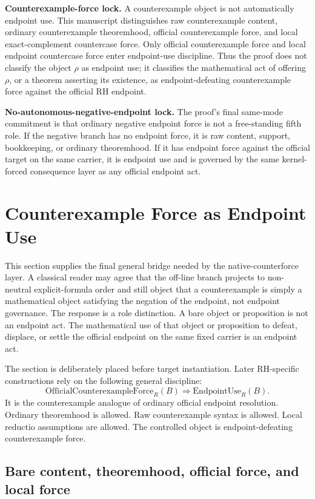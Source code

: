 \documentclass[11pt]{article}
\newcommand{\EndpointUse}{\mathrm{EndpointUse}}
\newcommand{\OfficialCxForce}{\mathrm{OfficialCounterexampleForce}}
\begin{document}
\textbf{Counterexample-force lock.} A counterexample object is not automatically endpoint use.  This manuscript distinguishes raw counterexample content, ordinary counterexample theoremhood, official counterexample force, and local exact-complement countercase force.  Only official counterexample force and local endpoint countercase force enter endpoint-use discipline.  Thus the proof does not classify the object \(\rho\) as endpoint use; it classifies the mathematical act of offering \(\rho\), or a theorem asserting its existence, as endpoint-defeating counterexample force against the official RH endpoint.

\textbf{No-autonomous-negative-endpoint lock.} The proof's final same-mode commitment is that ordinary negative endpoint force is not a free-standing fifth role.  If the negative branch has no endpoint force, it is raw content, support, bookkeeping, or ordinary theoremhood.  If it has endpoint force against the official target on the same carrier, it is endpoint use and is governed by the same kernel-forced consequence layer as any official endpoint act.

\newpage

\section{Counterexample Force as Endpoint Use}\label{sec:counterexample-force-endpoint-use}

This section supplies the final general bridge needed by the native-counterforce layer. A classical reader may agree that the off-line branch projects to non-neutral explicit-formula order and still object that a counterexample is simply a mathematical object satisfying the negation of the endpoint, not endpoint governance. The response is a role distinction. A bare object or proposition is not an endpoint act. The mathematical use of that object or proposition to defeat, displace, or settle the official endpoint on the same fixed carrier is an endpoint act.

The section is deliberately placed before target instantiation. Later RH-specific constructions rely on the following general discipline:
\[
\OfficialCxForce_R(B)\Rightarrow\EndpointUse_R(B).
\]
It is the counterexample analogue of ordinary official endpoint resolution. Ordinary theoremhood is allowed. Raw counterexample syntax is allowed. Local reductio assumptions are allowed. The controlled object is endpoint-defeating counterexample force.

\subsection{Bare content, theoremhood, official force, and local force}
\end{document}
